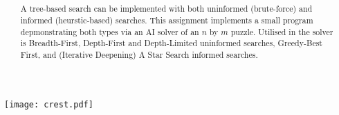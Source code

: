 \author
{
  { \authorname }
  { \small \scshape \studentid }
}
\date { \doccdate }
\title
{
  { \doctitle                         } \\
  { \slshape \normalsize \unitdesc    } \\
  { \scshape \normalsize \university  }
}

\maketitle

\begin{center}
  \texttt{[image: crest.pdf]}
\end{center}

\begin{abstract}
  A tree-based search can be implemented with both uninformed (brute-force) and
  informed (heurstic-based) searches. This assignment implements a small program
  depmonstrating both types via an AI solver of an $n$ by $m$ puzzle. Utilised
  in the solver is Breadth-First, Depth-First and Depth-Limited uninformed
  searches, Greedy-Best First, and (Iterative Deepening) A Star Search
  informed searches.
\end{abstract}
